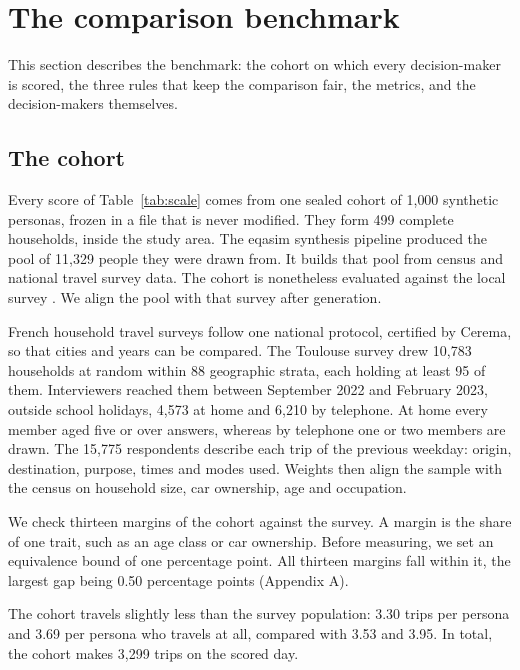 \section{The comparison benchmark}
\label{sec:bench}

This section describes the benchmark: the cohort on which every decision-maker is scored,
the three rules that keep the comparison fair, the metrics, and the decision-makers
themselves.

\subsection{The cohort}
\label{sec:cohort}

Every score of Table~\ref{tab:scale} comes from one sealed cohort of 1{,}000 synthetic
personas, frozen in a file that is never modified. They form 499 complete households, inside
the study area. The eqasim synthesis pipeline \citep{horl2021eqasim} produced the pool of
11{,}329 people they were drawn from. It builds that pool from census and national travel
survey data. The cohort is nonetheless evaluated against the local survey
\citep{tisseo2023emc2}. We align the pool with that survey after generation.

French household travel surveys follow one national protocol, certified by Cerema, so that
cities and years can be compared. The Toulouse survey drew 10{,}783 households at random within
88 geographic strata, each holding at least 95 of them. Interviewers reached them between
September 2022 and February 2023, outside school holidays, 4{,}573 at home and 6{,}210 by
telephone. At home every member aged five or over answers, whereas by telephone one or two
members are drawn. The 15{,}775 respondents describe each trip of the previous weekday: origin,
destination, purpose, times and modes used. Weights then align the sample with the census on
household size, car ownership, age and occupation.

We check thirteen margins of the cohort against the survey. A margin is the share of one
trait, such as an age class or car ownership. Before measuring, we set an equivalence bound
of one percentage point. All thirteen margins fall within it, the largest gap being 0.50
percentage points (Appendix A).

The cohort travels slightly less than the survey population: 3.30 trips per persona and 3.69
per persona who travels at all, compared with 3.53 and 3.95. In total, the cohort makes
3{,}299 trips on the scored day.

